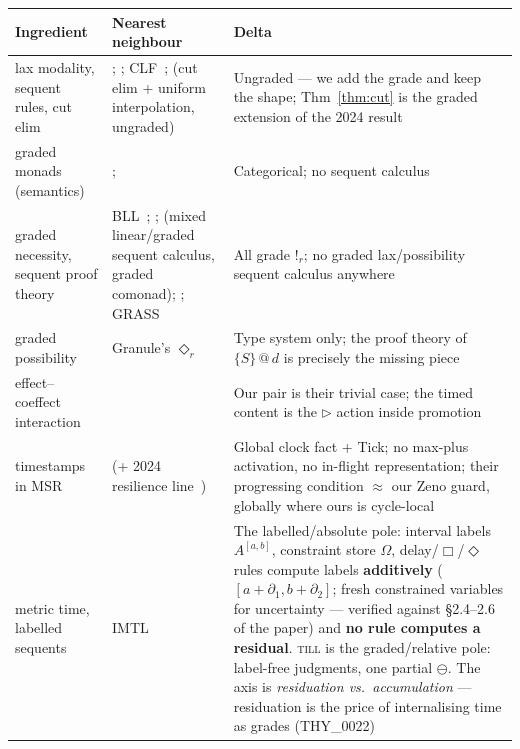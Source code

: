 \documentclass[11pt]{article}
\makeatletter
\newcommand{\lax}[2]{\{#1\}\mathbin{@}#2}       %
\newcommand{\gbang}[1]{{!}_{#1}}                 %
\newcommand{\act}{\mathbin{\rhd}}                %
\newcommand{\res}{\mathbin{\ominus}}             %
\newcommand{\till}{\textsc{till}}                %
\theoremstyle{definition}
\theoremstyle{remark}
\makeatother
\begin{document}
\begin{center}
\small
\setlength{\tabcolsep}{4pt}
\renewcommand{\arraystretch}{1.35}
\begin{longtable}{p{3.1cm}p{5.5cm}p{5.5cm}}
\toprule
\textbf{Ingredient} & \textbf{Nearest neighbour} & \textbf{Delta} \\
\midrule
\endhead
\bottomrule
\endfoot

lax modality, sequent rules, cut elim
&
\cite{FairtloughMendler1997}; \cite{PfenningDavies2001}; CLF~\cite{Watkins2002CLF};
\cite{Iemhoff2024} (cut elim + uniform interpolation, ungraded)
&
Ungraded --- we add the grade and keep the shape;
Thm~\ref{thm:cut} is the graded extension of the 2024 result
\\

graded monads (semantics)
&
\cite{Katsumata2014}; \cite{FujiiKatsumataMillies2016}
&
Categorical; no sequent calculus
\\

graded necessity, sequent proof theory
&
BLL~\cite{GirardScedrovScott1992};
\cite{MoonEadesOrchard2021};
\cite{VollmerMarshallEadesOrchard2025} (mixed linear/graded sequent calculus,
graded comonad);
\cite{HanukaevEades2025};
GRASS~\cite{GRASS2026}
&
All grade $\gbang{r}$; no graded lax/possibility sequent calculus anywhere
\\

graded possibility
&
Granule's $\Diamond_r$~\cite{OrchardLiepeltEades2019}
&
Type system only; the proof theory of $\lax{S}{d}$ is precisely the missing
piece
\\

effect--coeffect interaction
&
\cite{GaboardiICFP2016}
&
Our pair is their trivial case; the timed content is the $\act$ action inside
promotion
\\

timestamps in MSR
&
\cite{KanovichFORMATS2016} (+ 2024 resilience line~\cite{KanovichResilient2024})
&
Global clock fact + Tick; no max-plus activation, no in-flight representation;
their progressing condition $\approx$ our Zeno guard, globally where ours is
cycle-local
\\

metric time, labelled sequents
&
IMTL~\cite{deSaToninhoPfenning2023}
&
The labelled/absolute pole: interval labels $A^{[a,b]}$, constraint store
$\Omega$, delay/$\Box$/$\Diamond$ rules compute labels \textbf{additively}
($[a{+}\partial_1, b{+}\partial_2]$; fresh constrained variables for uncertainty
--- verified against \S2.4--2.6 of the paper) and \textbf{no rule computes a
residual}.  \till{} is the graded/relative pole: label-free judgments, one
partial $\res$.  The axis is \emph{residuation vs.\ accumulation} ---
residuation is the price of internalising time as grades (THY\_0022)
\\


\end{longtable}
\end{center}
\end{document}
